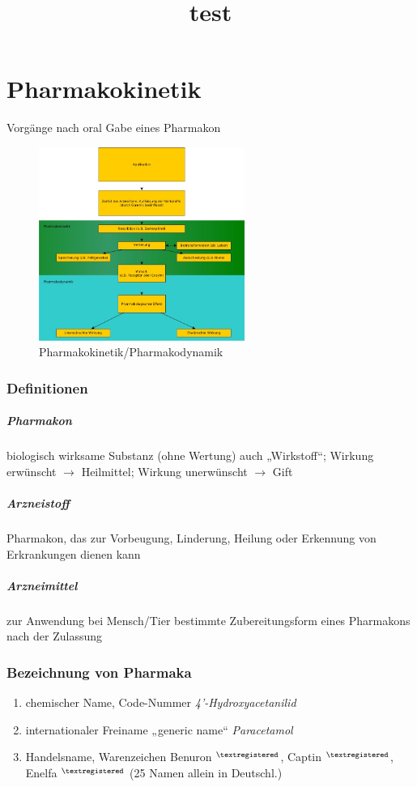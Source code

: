 \documentclass[10pt,a4paper]{report}
\title{test}
\begin{document}
\maketitle

\tableofcontents
\chapter{Pharmakokinetik} Vorgänge nach oral Gabe eines Pharmakon
\begin{figure}[h]
	\centering 
	\includegraphics[width=0.6\textwidth]{Pharmakokinetik.jpg} 
	\caption{Pharmakokinetik/Pharmakodynamik} 
	\label{fig:Pharmakokinetik}
\end{figure}
\subsection{Definitionen}
\paragraph{Pharmakon} biologisch wirksame Substanz (ohne Wertung)
		auch „Wirkstoff“; Wirkung erwünscht $\rightarrow$ Heilmittel;
					Wirkung unerwünscht  $\rightarrow$ Gift
\paragraph{Arzneistoff} Pharmakon, das zur Vorbeugung, Linderung, Heilung oder 
Erkennung von Erkrankungen dienen kann
\paragraph{Arzneimittel} zur Anwendung bei Mensch/Tier bestimmte Zubereitungsform eines Pharmakons nach der Zulassung
\subsection{Bezeichnung von Pharmaka}
\begin{enumerate}
	\item chemischer Name, Code-Nummer	\textit{4’-Hydroxyacetanilid}
	\item internationaler Freiname „generic name“	\textit{Paracetamol}
	\item Handelsname, Warenzeichen Benuron $^{\textregistered} $, Captin $ ^{\textregistered} $, Enelfa $^{\textregistered}$ 
	(25 Namen allein in Deutschl.)
\end{enumerate}
\end{document}
